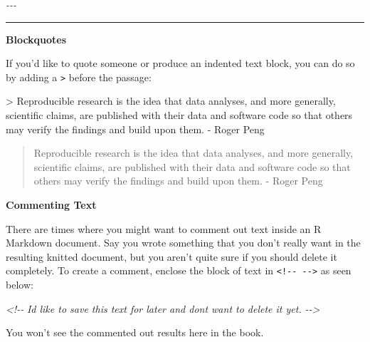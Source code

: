\documentclass[]{tufte-book}
\newenvironment{Shaded}{\begin{snugshade}}{\end{snugshade}}
\newcommand{\AttributeTok}[1]{\textcolor[rgb]{0.77,0.63,0.00}{#1}}
\newcommand{\CommentTok}[1]{\textcolor[rgb]{0.56,0.35,0.01}{\textit{#1}}}
\begin{document}
\begin{Shaded}
\begin{Highlighting}[]
\CommentTok{{-}{-}{-}}
\end{Highlighting}
\end{Shaded}

\begin{center}\rule{0.5\linewidth}{0.5pt}\end{center}

\textbf{Blockquotes}

If you'd like to quote someone or produce an indented text block, you can do so by adding a \texttt{\textgreater{}} before the passage:

\begin{Shaded}
\begin{Highlighting}[]
\AttributeTok{\textgreater{} Reproducible research is the idea that data analyses, and more generally,}
\AttributeTok{scientific claims, are published with their data and software code so that}
\AttributeTok{others may verify the findings and build upon them. {-} Roger Peng}
\end{Highlighting}
\end{Shaded}

\begin{quote}
Reproducible research is the idea that data analyses, and more generally, scientific claims, are published with their data and software code so that others may verify the findings and build upon them. - Roger Peng
\end{quote}

\textbf{Commenting Text}

There are times where you might want to comment out text inside an R Markdown document. Say you wrote something that you don't really want in the resulting knitted document, but you aren't quite sure if you should delete it completely. To create a comment, enclose the block of text in \texttt{\textless{}!-\/-\ -\/-\textgreater{}} as seen below:

\begin{Shaded}
\begin{Highlighting}[]
\CommentTok{\textless{}!{-}{-}}
\CommentTok{I\textquotesingle{}d like to save this text for later and don\textquotesingle{}t want to delete it yet.}
\CommentTok{{-}{-}\textgreater{}}
\end{Highlighting}
\end{Shaded}

You won't see the commented out results here in the book.
\end{document}
